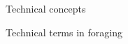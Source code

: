 \begin{section}{Technical concepts \label{sec:tc}}
\begin{subsection}{Technical terms in foraging \label{sec:foraging_terms}}
\end{subsection}


\end{section}
\FloatBarrier